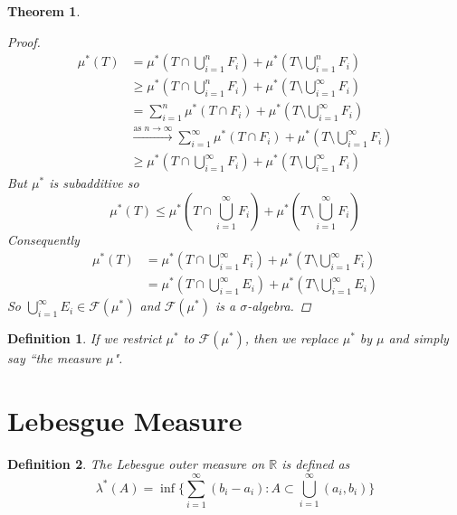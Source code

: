 \documentclass[12pt]{article}
\newtheorem{theorem}{Theorem}
\newtheorem{definition}{Definition}
\begin{document}
\begin{theorem}
\begin{proof}
		\begin{align*}
			\mu^*(T) &= \mu^*(T \cap \bigcup_{i=1}^n F_i) + \mu^*(T \setminus \bigcup_{i=1}^n F_i)\\
			&\ge \mu^*(T \cap \bigcup_{i=1}^n F_i) + \mu^*(T \setminus \bigcup_{i=1}^\infty F_i)\\
			&= \sum_{i=1}^n \mu^*(T \cap F_i) + \mu^*(T \setminus \bigcup_{i=1}^\infty F_i)\\
			& \xrightarrow{\text{as } n \to \infty} \sum_{i=1}^\infty \mu^*(T \cap F_i) + \mu^*(T \setminus \bigcup_{i=1}^\infty F_i)\\
			& \ge \mu^*(T \cap \bigcup_{i=1}^\infty F_i) + \mu^*(T \setminus \bigcup_{i=1}^\infty F_i)
		\end{align*}
		But $\mu^*$ is subadditive so
		$$\mu^*(T) \le \mu^*(T \cap \bigcup_{i=1}^\infty F_i) + \mu^*(T \setminus \bigcup_{i=1}^\infty F_i)$$
		Consequently
		\begin{align*}
			\mu^*(T) &= \mu^*(T \cap \bigcup_{i=1}^\infty F_i) + \mu^*(T \setminus \bigcup_{i=1}^\infty F_i)\\
			&= \mu^*(T \cap \bigcup_{i=1}^\infty E_i) + \mu^*(T \setminus \bigcup_{i=1}^\infty E_i)
		\end{align*}
		So $\bigcup_{i=1}^\infty E_i \in \mathcal{F}(\mu^*)$ and $\mathcal{F}(\mu^*)$ is a $\sigma$-algebra.	
	\end{proof}
\end{theorem}

\begin{definition} \label{D:MeasurableTerminology}
	If we restrict $\mu^*$ to $\mathcal{F}(\mu^*)$, then we replace $\mu^*$ by $\mu$ and simply say ``the measure $\mu$".
\end{definition}


\section{Lebesgue Measure}

\begin{definition} \label{D:LebesgueOuterMeasure}
	The \emph{Lebesgue outer measure on $\mathbb{R}$} is defined as
	$$\lambda^*(A) = \inf\{\sum_{i=1}^\infty(b_i - a_i) : A \subset \bigcup_{i=1}^\infty(a_i,b_i)\}$$
\end{definition}
\end{document}
